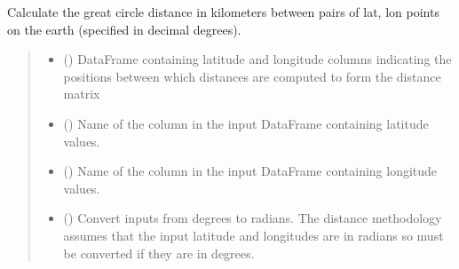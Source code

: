 \documentclass[letterpaper,10pt,english]{sphinxmanual}
\begin{document}
\begin{fulllineitems}
\label{\detokenize{misc:glomar_gridding.distances.haversine_distance_from_frame}}
\pysigstartsignatures
\pysiglinewithargsret
{}
{\sphinxparamcomma {}\sphinxparamcomma {}\sphinxparamcomma {}\sphinxparamcomma {}}
{}
\pysigstopsignatures
\sphinxAtStartPar
Calculate the great circle distance in kilometers between pairs of lat, lon
points on the earth (specified in decimal degrees).
\begin{quote}\begin{description}
\begin{itemize}
\item {}
\sphinxAtStartPar
{} () \textendash{} DataFrame containing latitude and longitude columns indicating the
positions between which distances are computed to form the distance
matrix

\item {}
\sphinxAtStartPar
{} () \textendash{} Name of the column in the input DataFrame containing latitude values.

\item {}
\sphinxAtStartPar
{} () \textendash{} Name of the column in the input DataFrame containing longitude values.

\item {}
\sphinxAtStartPar
{} () \textendash{} Convert inputs from degrees to radians. The distance methodology assumes
that the input latitude and longitudes are in radians so must be
converted if they are in degrees.


\end{itemize}
\end{description}
\end{quote}
\end{fulllineitems}
\end{document}
